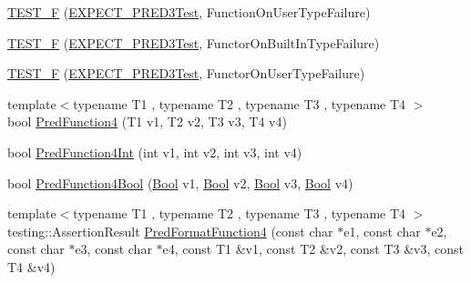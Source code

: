 \begin{DoxyCompactItemize}
\mbox{\hyperlink{_obj__test_2lib_2googletest-release-1_88_81_2googletest_2test_2gtest__pred__impl__unittest_8cc_a106aff3a64136441885a6948e79a35fd}{T\+E\+S\+T\+\_\+F}} (\mbox{\hyperlink{googletest-master_2googletest_2test_2gtest__pred__impl__unittest_8cc_a15eb53ab3f302d7bfffe1352f3902eb4}{E\+X\+P\+E\+C\+T\+\_\+\+P\+R\+E\+D3\+Test}}, Function\+On\+User\+Type\+Failure)
\item 
\mbox{\hyperlink{_obj__test_2lib_2googletest-release-1_88_81_2googletest_2test_2gtest__pred__impl__unittest_8cc_abc0b1019edf3bdd56ee46e82ece4cff8}{T\+E\+S\+T\+\_\+F}} (\mbox{\hyperlink{googletest-master_2googletest_2test_2gtest__pred__impl__unittest_8cc_a15eb53ab3f302d7bfffe1352f3902eb4}{E\+X\+P\+E\+C\+T\+\_\+\+P\+R\+E\+D3\+Test}}, Functor\+On\+Built\+In\+Type\+Failure)
\item 
\mbox{\hyperlink{_obj__test_2lib_2googletest-release-1_88_81_2googletest_2test_2gtest__pred__impl__unittest_8cc_a1d3e62b254c408b35bf05205699dca87}{T\+E\+S\+T\+\_\+F}} (\mbox{\hyperlink{googletest-master_2googletest_2test_2gtest__pred__impl__unittest_8cc_a15eb53ab3f302d7bfffe1352f3902eb4}{E\+X\+P\+E\+C\+T\+\_\+\+P\+R\+E\+D3\+Test}}, Functor\+On\+User\+Type\+Failure)
\item 
{\footnotesize template$<$typename T1 , typename T2 , typename T3 , typename T4 $>$ }\\bool \mbox{\hyperlink{_obj__test_2lib_2googletest-release-1_88_81_2googletest_2test_2gtest__pred__impl__unittest_8cc_a69db8bec40f25365dbd42dbe6c3319fe}{Pred\+Function4}} (T1 v1, T2 v2, T3 v3, T4 v4)
\item 
bool \mbox{\hyperlink{_obj__test_2lib_2googletest-release-1_88_81_2googletest_2test_2gtest__pred__impl__unittest_8cc_a105a045112a34fb2b65360c0d5daf81e}{Pred\+Function4\+Int}} (int v1, int v2, int v3, int v4)
\item 
bool \mbox{\hyperlink{_obj__test_2lib_2googletest-release-1_88_81_2googletest_2test_2gtest__pred__impl__unittest_8cc_a5d842d3bce2d16793299e77d1cb5c980}{Pred\+Function4\+Bool}} (\mbox{\hyperlink{struct_bool}{Bool}} v1, \mbox{\hyperlink{struct_bool}{Bool}} v2, \mbox{\hyperlink{struct_bool}{Bool}} v3, \mbox{\hyperlink{struct_bool}{Bool}} v4)
\item 
{\footnotesize template$<$typename T1 , typename T2 , typename T3 , typename T4 $>$ }\\testing\+::\+Assertion\+Result \mbox{\hyperlink{_obj__test_2lib_2googletest-release-1_88_81_2googletest_2test_2gtest__pred__impl__unittest_8cc_a9fbd4c3333dcc98c0cfee19ce28bc2b1}{Pred\+Format\+Function4}} (const char $\ast$e1, const char $\ast$e2, const char $\ast$e3, const char $\ast$e4, const T1 \&v1, const T2 \&v2, const T3 \&v3, const T4 \&v4)

\end{DoxyCompactItemize}
